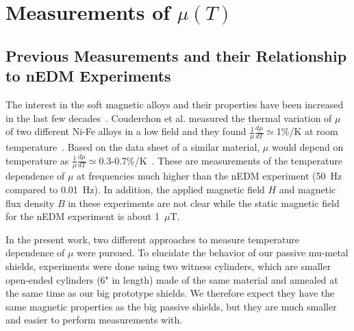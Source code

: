 \documentclass[review]{elsarticle}
\begin{document}
\section{Measurements of $\mu(T)$}

\subsection{Previous Measurements and their Relationship to nEDM Experiments}
The interest in the soft magnetic alloys and their properties have
been increased in the last few
decades~\cite{bib:pfeifer,bib:bozorth,bib:couderchon}. Couderchon et
al. measured the thermal variation of $\mu$ of two different Ni-Fe
alloys in a low field and they found $\frac{1}{\mu}\frac{d\mu}{dT}\simeq$1\%/K at room
temperature~\cite{bib:couderchon}. Based on the data sheet of a
similar material, $\mu$ would depend on temperature as
$\frac{1}{\mu}\frac{d\mu}{dT}\simeq$0.3-0.7\%/K~\cite{bib:kruppvdm}. These
are measurements of the temperature dependence of $\mu$ at frequencies
much higher than the nEDM experiment (50~Hz compared to 0.01~Hz). In
addition, the applied magnetic field $H$ and magnetic flux density $B$
in these experiments are not clear while the static magnetic field for
the nEDM experiment is about 1~$\mu$T.

In the present work, two different approaches to measure temperature
dependence of $\mu$ were pursued. To elucidate the behavior of our
passive mu-metal shields, experiments were done using two witness
cylinders, which are smaller open-ended cylinders (6" in length) made
of the same material and annealed at the same time as our big
prototype shields. We therefore expect they have the same magnetic
properties as the big passive shields, but they are much smaller and
easier to perform measurements with.
\end{document}
